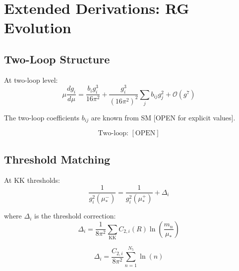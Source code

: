 \documentclass[11pt,a4paper]{article}
\theoremstyle{definition}
\begin{document}
\section{Extended Derivations: RG Evolution}
\label{sec:rg_extended}

\subsection{Two-Loop Structure}
\label{subsec:two_loop}

At two-loop level:
\begin{equation}
\label{eq:two_loop_beta}
\mu \frac{dg_i}{d\mu} = \frac{b_i g_i^3}{16\pi^2} + \frac{g_i^3}{(16\pi^2)^2} \sum_j b_{ij} g_j^2 + \mathcal{O}(g^7)
\end{equation}

The two-loop coefficients $b_{ij}$ are known from SM [OPEN for explicit values].

\begin{equation}
\label{eq:two_loop_tag}
\text{Two-loop: } [\text{OPEN}]
\end{equation}

\subsection{Threshold Matching}
\label{subsec:threshold_matching}

At KK thresholds:
\begin{equation}
\label{eq:threshold_correction}
\frac{1}{g_i^2(\mu_*^-)} = \frac{1}{g_i^2(\mu_*^+)} + \Delta_i
\end{equation}

where $\Delta_i$ is the threshold correction:
\begin{equation}
\label{eq:Delta_form}
\Delta_i = \frac{1}{8\pi^2} \sum_{\text{KK}} C_{2,i}(R) \ln\left(\frac{m_n}{\mu_*}\right)
\end{equation}

\begin{equation}
\label{eq:Delta_simplified}
\Delta_i = \frac{C_{2,i}}{8\pi^2} \sum_{n=1}^{N_5} \ln(n)
\end{equation}
\end{document}
